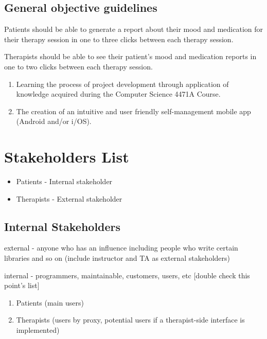 \documentclass[11pt]{article}
\begin{document}
    \subsection{General objective guidelines}\label{subsec:general-objective-guidelines}
    Patients should be able to generate a report about their mood and medication for their therapy session in one to three clicks between each therapy session.

    Therapists should be able to see their patient's mood and medication reports in one to two clicks between each therapy session.

    \begin{enumerate}
        \item Learning the process of project development through application of knowledge acquired during the Computer Science 4471A Course.
        \item The creation of an intuitive and user friendly self-management mobile app (Android and/or i/OS).
    \end{enumerate}


    \section{Stakeholders List}\label{sec:stakeholders-list}
    \begin{itemize}
        \item Patients - Internal stakeholder
        \item Therapists - External stakeholder
    \end{itemize}

    \subsection{Internal Stakeholders}\label{subsec:internal-stakeholders}

    \item external - anyone who has an influence\; including people who write certain libraries and so on  (include instructor and TA as external stakeholders)
    \item internal - programmers, maintainable, customers, users, etc [double check this point's list]

    \begin{enumerate}
        \item Patients (main users)
        \item Therapists (users by proxy, potential users if a therapist-side interface is implemented)
    \end{enumerate}
\end{document}
